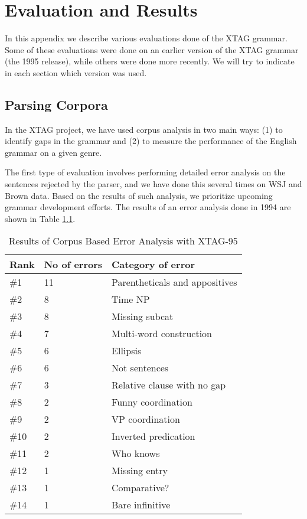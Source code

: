 \chapter{Evaluation and Results}
\label{evaluation}

In this appendix we describe various evaluations done of the XTAG
grammar. Some of these evaluations were done on an earlier version of
the XTAG grammar (the 1995 release), while others were done more
recently. We will try to indicate in each section which version was
used. 

\section{Parsing Corpora}

In the XTAG project, we have used corpus analysis in two main ways: (1) to
identify gaps in the grammar and (2) to measure the performance of the
English grammar on a given genre.

The first type of evaluation involves performing detailed error
analysis on the sentences rejected by the parser, and we have done
this several times on WSJ and Brown data.
Based on the results of such analysis, we prioritize upcoming grammar
development efforts. The results of an error analysis done in 1994
\cite{xtag-notes} are shown in Table \ref{errors94}.  

\begin{table}[htb]
\centering
\begin{tabular}{|l|l|l|} \hline
Rank & No of errors & Category of error \\ \hline
\#1  & 11  &    Parentheticals and appositives \\ \hline
\#2  & 8     &  Time NP \\ \hline
\#3  & 8  &     Missing subcat \\ \hline
\#4  & 7 &      Multi-word construction \\ \hline
\#5  & 6 &       Ellipsis \\ \hline
\#6  & 6  &      Not sentences \\ \hline
\#7  & 3  &      Relative clause with no gap \\ \hline
\#8  & 2  &      Funny coordination \\ \hline
\#9  & 2  &      VP coordination \\ \hline
\#10  & 2  &      Inverted predication \\ \hline
\#11  & 2  &      Who knows \\ \hline
\#12  & 1  &      Missing entry \\ \hline
\#13  & 1   &     Comparative? \\ \hline
\#14  & 1    &    Bare infinitive \\ \hline
\end{tabular}
\caption{Results of Corpus Based Error Analysis with XTAG-95}
\label{errors94}
\end{table}


